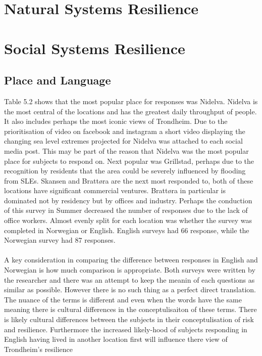 
\section{Natural Systems Resilience}

\section{Social Systems Resilience}

\subsection{Place and Language}
Table 5.2 shows that the most popular place for responses was Nidelva. Nidelva is the most central of the locations and has the greatest daily throughput of people. It also includes perhaps the most iconic views of Trondheim. Due to the prioritisation of video on facebook and instagram a short video displaying the changing sea level extremes projected for Nidelva was attached to each social media post. This may be part of the reason that Nidelva was the most popular place for subjects to respond on.  Next popular was Grillstad, perhaps due to the recognition by residents that the area could be severely influenced by flooding from SLEs. Skansen and Brattøra are the next most responded to, both of these locations have significant commercial ventures. Brattøra in particular is dominated not by residency but by offices and industry. Perhaps the conduction of this survey in Summer decreased the number of responses due to the lack of office workers. Almost evenly split for each location was whether the survey was completed in Norwegian or English. English surveys had 66 response, while the Norwegian survey had 87 responses.
\paragraph{}
A key consideration in comparing the difference between responses in English and Norwegian is how much comparison is appropriate. Both surveys were written by the researcher and there was an attempt to keep the meanin of each questions as similar as possible. However there is no such thing as a perfect direct translation. The nuance of the terms is different and even when the words have the same meaning there is cultural differences in the conceptulisaiton of these terms. There is likely cultural differences between the subjects in their conceptulisation of risk and resilience. Furthermore the increased likely-hood of subjects responding in English having lived in another location first will influence there view of Trondheim's resilience


